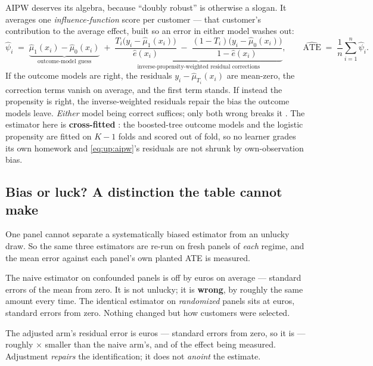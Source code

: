 AIPW deserves its algebra, because ``doubly robust'' is otherwise a slogan. It averages one
\emph{influence-function} score per customer --- that customer's contribution to the average effect,
built so an error in either model washes out:
%
\begin{equation}
  \hat\psi_i \;=\; \underbrace{\hat\mu_1(x_i) - \hat\mu_0(x_i)}_{\text{outcome-model guess}}
    \;+\; \underbrace{\frac{T_i\big(y_i - \hat\mu_1(x_i)\big)}{\hat e(x_i)}
        \;-\; \frac{(1 - T_i)\big(y_i - \hat\mu_0(x_i)\big)}{1 - \hat e(x_i)}}_{
        \text{inverse-propensity-weighted residual corrections}},
  \qquad
  \widehat{\text{ATE}} \;=\; \frac{1}{n}\sum_{i=1}^{n} \hat\psi_i .
  \label{eq:up:aipw}
\end{equation}
%
If the outcome models are right, the residuals $y_i - \hat\mu_{T_i}(x_i)$ are mean-zero, the
correction terms vanish on average, and the first term stands. If instead the propensity is right,
the inverse-weighted residuals repair the bias the outcome models leave. \emph{Either} model being
correct suffices; only both wrong breaks it \citep{robins1994}. The estimator here is
\textbf{cross-fitted} \citep{chernozhukov2018}: the boosted-tree outcome models and the logistic
propensity are fitted on $K-1$ folds and scored out of fold, so no learner grades its own homework
and \cref{eq:up:aipw}'s residuals are not shrunk by own-observation bias.



\subsection*{Bias or luck? A distinction the table cannot make}

One panel cannot separate a systematically biased estimator from an unlucky draw. So the same
three estimators are re-run on \nbOneNPanels{} fresh panels of \emph{each} regime, and the mean
error against each panel's own planted ATE is measured.

The naive estimator on confounded panels is off by \nbOneNaivePanelBias{} euros on average ---
\nbOneNaivePanelSes{} standard errors of the mean from zero. It is not unlucky; it is
\textbf{wrong}, by roughly the same amount every time. The identical estimator on
\emph{randomized} panels sits at \nbOneRctPanelBias{} euros, \nbOneRctPanelSes{} standard errors
from zero. Nothing changed but how customers were selected.

The adjusted arm's residual error is \nbOneLinPanelBias{} euros --- \nbOneLinPanelSes{} standard
errors from zero, so it is \nbOneResidVerdict{} --- roughly \nbOneBiasShrink$\times$ smaller than
the naive arm's, and \pc{\nbOneLinResidPct} of the effect being measured. Adjustment
\emph{repairs} the identification; it does not \emph{anoint} the estimate.

